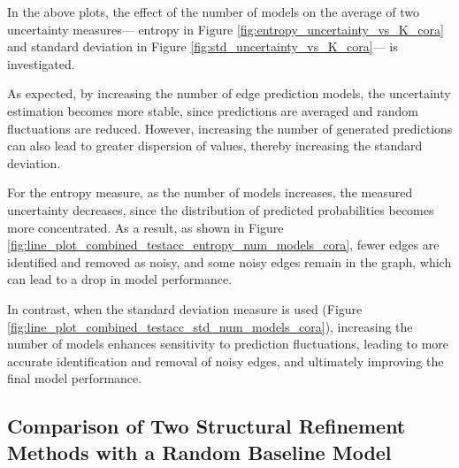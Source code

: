 \documentclass{article}
\begin{document}
In the above plots, the effect of the number of models on the average of two uncertainty measures—
entropy in Figure \ref{fig:entropy_uncertainty_vs_K_cora}
and standard deviation in Figure \ref{fig:std_uncertainty_vs_K_cora}—
is investigated.

As expected, by increasing the number of edge prediction models,
the uncertainty estimation becomes more stable,
since predictions are averaged and random fluctuations are reduced.
However, increasing the number of generated predictions
can also lead to greater dispersion of values,
thereby increasing the standard deviation.

For the entropy measure,
as the number of models increases,
the measured uncertainty decreases,
since the distribution of predicted probabilities becomes more concentrated.
As a result, as shown in Figure
\ref{fig:line_plot_combined_testacc_entropy_num_models_cora},
fewer edges are identified and removed as noisy,
and some noisy edges remain in the graph,
which can lead to a drop in model performance.

In contrast, when the standard deviation measure is used
(Figure \ref{fig:line_plot_combined_testacc_std_num_models_cora}),
increasing the number of models
enhances sensitivity to prediction fluctuations,
leading to more accurate identification and removal of noisy edges,
and ultimately improving the final model performance.

\subsection{Comparison of Two Structural Refinement Methods with a Random Baseline Model}
\end{document}
